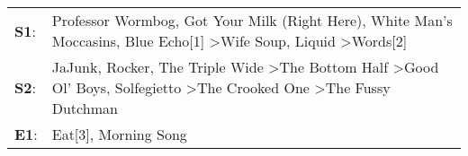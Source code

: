 \begin{supertabular}{p{0.03\textwidth}p{0.92\textwidth}}
 \textbf{S1}:  &                                                       Professor Wormbog\textsuperscript{}, \enspace Got Your Milk (Right Here)\textsuperscript{}, \enspace White Man's Moccasins\textsuperscript{}, \enspace Blue Echo[1]\textsuperscript{} \textgreater \enspace Wife Soup\textsuperscript{}, \enspace Liquid\textsuperscript{} \textgreater \enspace Words[2]\textsuperscript{}  \enspace  \\
 \textbf{S2}:  &  JaJunk\textsuperscript{}, \enspace Rocker\textsuperscript{}, \enspace The Triple Wide\textsuperscript{} \textgreater \enspace The Bottom Half\textsuperscript{} \textgreater \enspace Good Ol' Boys\textsuperscript{}, \enspace Solfegietto\textsuperscript{} \textgreater \enspace The Crooked One\textsuperscript{} \textgreater \enspace The Fussy Dutchman\textsuperscript{}  \enspace  \\
 \textbf{E1}:  &                                                                                                                                                                                                                                                                                                                 Eat[3]\textsuperscript{}, \enspace Morning Song\textsuperscript{}  \enspace  \\
\end{supertabular}
